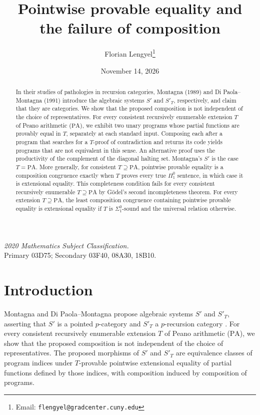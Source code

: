 \documentclass[11pt]{article}
\title{Pointwise provable equality and the failure of composition}
\author{Florian Lengyel\thanks{Email: \texttt{flengyel@gradcenter.cuny.edu}}}
\date{November 14, 2026}
\newcommand{\PA}{\mathrm{PA}}
\begin{document}
\maketitle

\begin{abstract}
In their studies of pathologies in recursion categories, Montagna (1989) and Di Paola--Montagna (1991) introduce the algebraic
systems $S'$ and $S'_T$, respectively, and claim that they are categories. We show that the proposed composition is not independent 
of the choice of representatives. For every consistent recursively enumerable extension $T$ of Peano arithmetic ($\mathrm{PA}$), 
we exhibit two unary programs whose partial functions are provably equal in $T$, separately at each standard input. Composing each after a 
program that searches for a $T$-proof of contradiction and returns its code yields programs that are not
equivalent in this sense. An alternative proof uses the productivity of the complement of the diagonal halting set. 
Montagna's $S'$ is the case $T=\mathrm{PA}$. More generally, for consistent $T\supseteq\mathrm{PA}$, pointwise provable 
equality is a composition congruence exactly when $T$ proves every true $\Pi^0_1$ sentence, in which case it 
is extensional equality. This completeness condition fails for every consistent recursively enumerable $T\supseteq\mathrm{PA}$ 
by G\"odel's second incompleteness theorem. For every extension $T\supseteq\mathrm{PA}$, the least composition congruence 
containing pointwise provable equality is extensional equality if $T$ is $\Sigma^0_1$-sound and the universal relation otherwise.
\end{abstract}

\noindent\textit{2020 Mathematics Subject Classification.}\\
Primary 03D75; Secondary 03F40, 08A30, 18B10.

\section{Introduction}\label{sec:introduction}

Montagna and Di Paola--Montagna propose algebraic systems $S'$ and
$S'_T$, asserting that $S'$ is a pointed $p$-category
\cite[pp.~106, 108]{Montagna} and $S'_T$ a $p$-recursion category
\cite[p.~646]{DiPaolaMontagna}.
For every consistent recursively enumerable extension $T$ of
Peano arithmetic ($\PA$), we show that the proposed composition is not
independent of the choice of representatives.
The proposed morphisms of $S'$ and $S'_T$ are equivalence classes
of program indices under $T$-provable pointwise extensional equality
of partial functions defined by those indices, with composition induced
by composition of programs.
\end{document}
